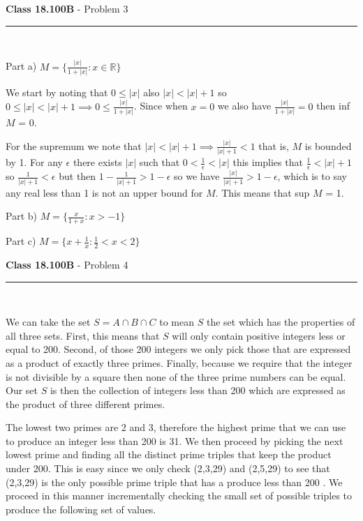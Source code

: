 \documentclass[11pt,reqno]{article}
\begin{document}
\newpage
\vspace{15pt}
\begin{flushleft} 
\textbf{Class 18.100B} - Problem 3\\
\rule{500pt}{1pt}\\
\end{flushleft} 

\noindent Part a) $M = \lbrace \frac{|x|}{1 + |x|} : x \in \mathbb{R} \rbrace $
\vspace{10pt}

We start by noting that $0 \le |x|$ also $|x| < |x| + 1$ so $0 \le |x| < |x| + 1 \implies 0 \le \frac{|x|}{1+ |x|}$. Since when $x = 0$ we also have $ \frac{|x|}{1+ |x|} = 0$ then inf $M$ = 0. 

For the supremum we note that $|x| < |x| + 1 \implies \frac{|x|}{|x|+1} < 1$ that is, $M$ is bounded by 1. For any $\epsilon$ there exists $|x|$ such that $0 < \frac{1}{\epsilon} < |x|$ this implies that $\frac{1}{\epsilon} < |x| + 1$ so $\frac{1}{|x| + 1} < \epsilon$ but then $1 - \frac{1}{|x| + 1}  > 1 - \epsilon$ so we have $\frac{|x|}{|x| + 1}  > 1 - \epsilon$, which is to say any real less than 1 is not an upper bound for $M$. This means that sup $M$ = 1.

\vspace{10pt}
\noindent Part b) $M = \lbrace \frac{x}{1 + x} : x > -1 \rbrace $
\vspace{10pt}

\noindent Part c) $M = \lbrace x + \frac{1}{x} : \frac{1}{2} < x < 2 \rbrace $
\vspace{10pt}

\vspace{15pt}
\begin{flushleft} 
\textbf{Class 18.100B} - Problem 4\\
\rule{500pt}{1pt}\\
\end{flushleft} 

We can take the set $S = A \cap B \cap C$ to mean $S$ the set which has the properties of all three sets. First, this means that $S$ will only contain positive integers less or equal to 200. Second, of those 200 integers we only pick those that are expressed as a product of exactly three primes. Finally, because we require that the integer is not divisible by a square then none of the three prime numbers can be equal. Our set $S$ is then the collection of integers less than 200 which are expressed as the product of three different primes.

The lowest two primes are 2 and 3, therefore the highest prime that we can use to produce an integer less than 200 is 31. We then proceed by picking the next lowest prime and finding all the distinct prime triples that keep the product under 200. This is easy since we only check (2,3,29) and (2,5,29) to see that (2,3,29) is the only possible prime triple that has a produce less than 200 . We proceed in this manner incrementally checking the small set of possible triples to produce the following set of values.
\vspace{10pt}
\end{document}

